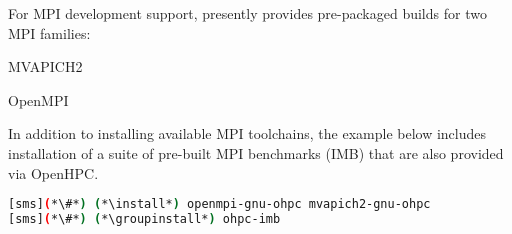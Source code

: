 For MPI development support, \OHPC{} presently provides pre-packaged builds for
two MPI families: 

\begin{itemize*}
\item MVAPICH2
\item OpenMPI

\end{itemize*}

In addition to installing available MPI toolchains, the example below includes
installation of a suite of pre-built MPI benchmarks (IMB) that are also provided
via OpenHPC.

\begin{lstlisting}[language=bash]
[sms](*\#*) (*\install*) openmpi-gnu-ohpc mvapich2-gnu-ohpc
[sms](*\#*) (*\groupinstall*) ohpc-imb
\end{lstlisting}
